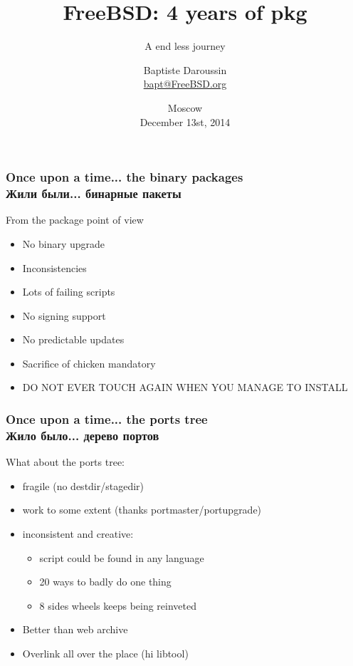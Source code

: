 
\newcommand{\prestitle}{RuBSD 14}

\title{FreeBSD: 4 years of pkg}
\subtitle{A end less journey}
\author{Baptiste Daroussin \\ \url{bapt@FreeBSD.org}}
\date{Moscow \\ December 13st, 2014}


\begin{frame}[plain]
	\titlepage
\end{frame}

\begin{frame}
	\frametitle{Once upon a time... the binary packages \\ Жили были... бинарные пакеты}
	From the package point of view
	\begin{itemize}
		\item No binary upgrade
		\item Inconsistencies
		\item Lots of failing scripts
		\item No signing support
		\item No predictable updates
		\item Sacrifice of chicken mandatory
		\item DO NOT EVER TOUCH AGAIN WHEN YOU MANAGE TO INSTALL
	\end{itemize}
\end{frame}

\begin{frame}
	\frametitle{Once upon a time... the ports tree \\ Жило было... дерево портов}
	What about the ports tree:
	\begin{itemize}
		\item fragile (no destdir/stagedir)
		\item work to some extent (thanks portmaster/portupgrade)
		\item inconsistent and creative:
			\begin{itemize}
				\item script could be found in any language
				\item 20 ways to badly do one thing
				\item 8 sides wheels keeps being reinveted
			\end{itemize}
		\item Better than web archive
		\item Overlink all over the place (hi libtool)
	\end{itemize}
\end{frame}

